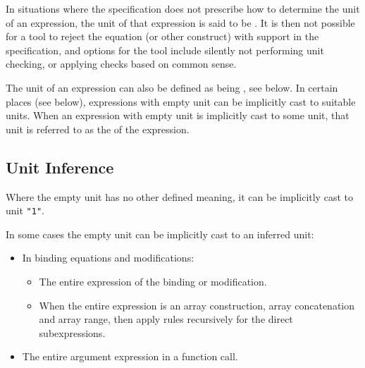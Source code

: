 In situations where the specification does not prescribe how to determine the unit of an expression, the unit of that expression is said to be .
It is then not possible for a tool to reject the equation (or other construct) with support in the specification, and options for the tool include silently not performing unit checking, or applying checks based on common sense.

The unit of an expression can also be defined as being , see below.
In certain places (see below), expressions with empty unit can be implicitly cast to suitable units.
When an expression with empty unit is implicitly cast to some unit, that unit is referred to as the  of the expression.


\subsection{Unit Inference}\label{unit-inference}

Where the empty unit has no other defined meaning, it can be implicitly cast to unit \lstinline!"1"!.

In some cases the empty unit can be implicitly cast to an inferred unit:
\begin{itemize}
\item
  In binding equations and modifications:
  \begin{itemize}
  \item The entire expression of the binding or modification.
  \item When the entire expression is an array construction, array concatenation and array range, then apply rules recursively for the direct subexpressions.
  \end{itemize}
\item
  The entire argument expression in a function call.
\end{itemize}


